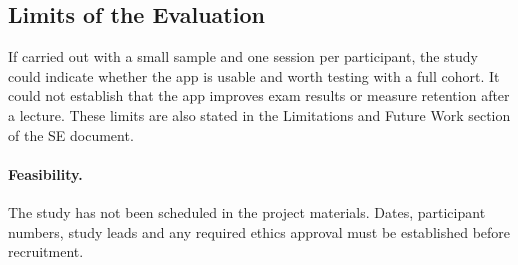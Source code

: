 \subsection{Limits of the Evaluation}
If carried out with a small sample and one session per participant, the study could indicate whether the app is usable and worth testing with a full cohort. It could not establish that the app improves exam results or measure retention after a lecture. These limits are also stated in the Limitations and Future Work section of the SE document.
 
\paragraph{Feasibility.} The study has not been scheduled in the project materials. Dates, participant numbers, study leads and any required ethics approval must be established before recruitment.